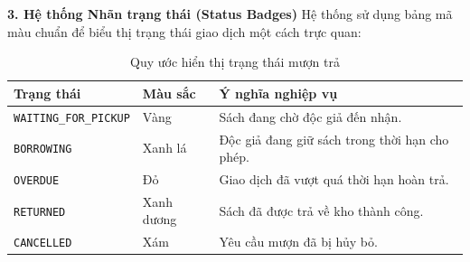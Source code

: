 \noindent\textbf{3. Hệ thống Nhãn trạng thái (Status Badges)}
Hệ thống sử dụng bảng mã màu chuẩn để biểu thị trạng thái giao dịch một cách trực quan:
\begin{table}[H]
    \centering
    \caption{Quy ước hiển thị trạng thái mượn trả}
    \renewcommand{\arraystretch}{1.3}
    \begin{tabularx}{0.8\textwidth}{|l|l|X|}
        \hline
        \textbf{Trạng thái} & \textbf{Màu sắc} & \textbf{Ý nghĩa nghiệp vụ} \\ \hline
        \texttt{WAITING\_FOR\_PICKUP} & Vàng & Sách đang chờ độc giả đến nhận. \\ \hline
        \texttt{BORROWING} & Xanh lá & Độc giả đang giữ sách trong thời hạn cho phép. \\ \hline
        \texttt{OVERDUE} & Đỏ & Giao dịch đã vượt quá thời hạn hoàn trả. \\ \hline
        \texttt{RETURNED} & Xanh dương & Sách đã được trả về kho thành công. \\ \hline
        \texttt{CANCELLED} & Xám & Yêu cầu mượn đã bị hủy bỏ. \\ \hline
    \end{tabularx}
\end{table}


